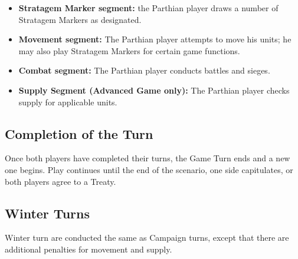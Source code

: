 \begin{itemize}
  \item \textbf{Stratagem Marker segment:} the Parthian player draws a number of Stratagem Markers as designated.
  \item \textbf{Movement segment:} The Parthian player attempts to move his units; he may also play Stratagem Markers for certain game functions.
  \item \textbf{Combat segment:} The Parthian player conducts battles and sieges.
  \item \textbf{Supply Segment (Advanced Game only):} The Parthian player checks supply for applicable units.
\end{itemize}

\subsection{Completion of the Turn}

Once both players have completed their turns, the Game Turn ends and a new one begins. Play continues until the end of the scenario, one side capitulates, or both players agree to a Treaty.

\subsection{Winter Turns}

Winter turn are conducted the same as Campaign turns, except that there are additional penalties for movement and supply.